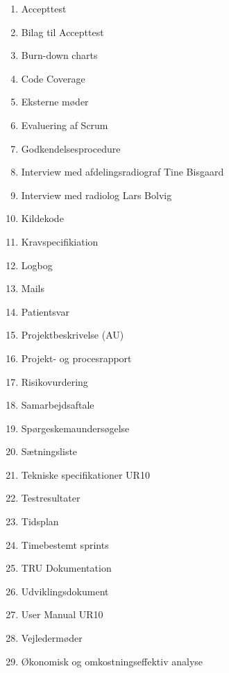 \begin{enumerate}
\item Accepttest 					 		\label{Accepttest}
\item Bilag til Accepttest						\label{BilagAccepttest}
\item Burn-down charts						\label{BurnDown}
\item Code Coverage 						\label{Code Coverage}
\item Eksterne møder						\label{Eksterne moder} 
\item Evaluering af Scrum 						\label{Evaluering Scrum} 
\item Godkendelsesprocedure 					\label{Godkendelsesprocedure}
\item Interview med afdelingsradiograf Tine Bisgaard 	\label{Tine}
\item Interview med radiolog Lars Bolvig  			\label{Telefoninterview}
\item Kildekode							\label{Kildekode} 
\item Kravspecifikiation 						\label{Kravspecifikation}
\item Logbog								\label{Logbog}
\item Mails								\label{Mails}
\item Patientsvar							\label{Patientsvar} 
\item Projektbeskrivelse (AU) 					\label{Projektbeskrivelse}
\item Projekt- og procesrapport 					\label{Projekt- og procesrapport}
\item Risikovurdering 						\label{Risikovurdering} 
\item Samarbejdsaftale						\label{Samarbejdesaftale} 
\item Spørgeskemaundersøgelse 					\label{Sporgeskemaundersogelse}
\item Sætningsliste 							\label{Satningsliste}
\item Tekniske specifikationer UR10				\label{UR10spec}
\item Testresultater 						\label{TestResultater}
\item Tidsplan							\label{Tidsplan}
\item Timebestemt sprints 						\label{Timebestemt sprints}
\item TRU Dokumentation \label{TRUDokumentation}
\item Udviklingsdokument 						\label{Udviklingsdokument}
\item User Manual UR10 						\label{UserManualUR10}
\item Vejledermøder						\label{Vejledermoder}
\item Økonomisk og omkostningseffektiv analyse		\label{Okonomi}
\end{enumerate}

